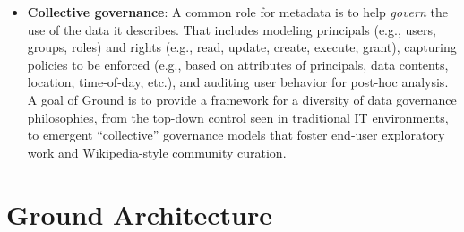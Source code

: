 \documentclass[10pt,letterpaper]{article}
\begin{document}
\begin{itemize}
\item {\bf Collective governance}: A common role for metadata is to help \emph{govern} the use of the data it describes.  That includes modeling principals (e.g., users, groups, roles) and rights (e.g., read, update, create, execute, grant), capturing policies to be enforced (e.g., based on attributes of principals, data contents, location, time-of-day, etc.), and auditing user behavior for post-hoc analysis.
A goal of Ground is to provide a framework for a diversity of data governance philosophies, from the top-down control seen in traditional IT environments, to emergent ``collective'' governance models that foster end-user exploratory work and Wikipedia-style community curation.
\end{itemize}


\section{Ground Architecture}

\end{document}
